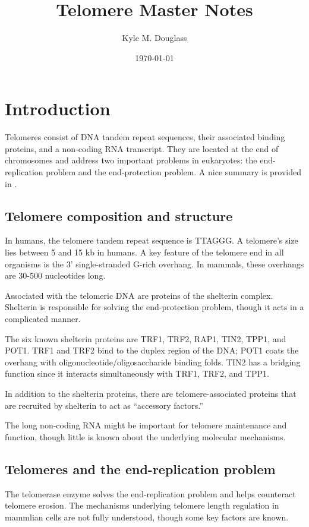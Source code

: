 \documentclass[11pt]{article}
\author{Kyle M. Douglass}
\date{\today}
\title{Telomere Master Notes}
\begin{document}
\maketitle
\tableofcontents


\section{Introduction}
\label{sec-1}
Telomeres consist of DNA tandem repeat sequences, their associated
binding proteins, and a non-coding RNA transcript. They are located at
the end of chromosomes and address two important problems in
eukaryotes: the end-replication problem and the end-protection
problem. A nice summary is provided in \cite{sfeir-jcellsci-2012}.

\subsection{Telomere composition and structure}
\label{sec-1-1}
In humans, the telomere tandem repeat sequence is TTAGGG. A telomere's
size lies between 5 and 15 kb in humans. A key feature of the telomere
end in all organisms is the 3' single-stranded G-rich overhang. In
mammals, these overhangs are 30-500 nucleotides long.

Associated with the telomeric DNA are proteins of the shelterin
complex. Shelterin is responsible for solving the end-protection problem,
though it acts in a complicated manner.


The six known shelterin proteins are TRF1, TRF2, RAP1, TIN2, TPP1, and
POT1. TRF1 and TRF2 bind to the duplex region of the DNA; POT1 coats
the overhang with oligonucleotide/oligosaccharide binding folds. TIN2
has a bridging function since it interacts simultaneously with TRF1,
TRF2, and TPP1.

In addition to the shelterin proteins, there are telomere-associated
proteins that are recruited by shelterin to act as ``accessory
factors.''

The long non-coding RNA might be important for telomere maintenance
and function, though little is known about the underlying molecular
mechanisms.

\subsection{Telomeres and the end-replication problem}
\label{sec-1-2}
The telomerase enzyme solves the end-replication problem and helps
counteract telomere erosion. The mechanisms underlying telomere length
regulation in mammlian cells are not fully understood, though some key
factors are known.
\end{document}
